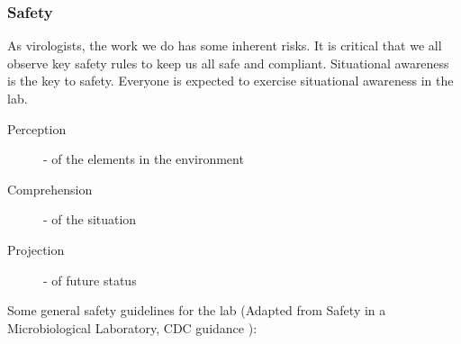\documentclass[10pt, a4paper, twocolumn]{article} %
\begin{document}
\subsubsection{Safety}
As virologists, the work we do has some inherent risks. It is critical that we all observe key safety rules to keep us all safe and compliant.\newline
Situational awareness is the key to safety. Everyone is expected to exercise situational awareness in the lab.
\begin{description}
\item [Perception] - of the elements in the environment
\item [Comprehension] - of the situation
\item [Projection] - of future status
\end{description}
Some general safety guidelines for the lab (Adapted from Safety in a Microbiological Laboratory, CDC guidance \citep{US_Department_of_Health_and_Human_Services2020-ck}):
\end{document}
